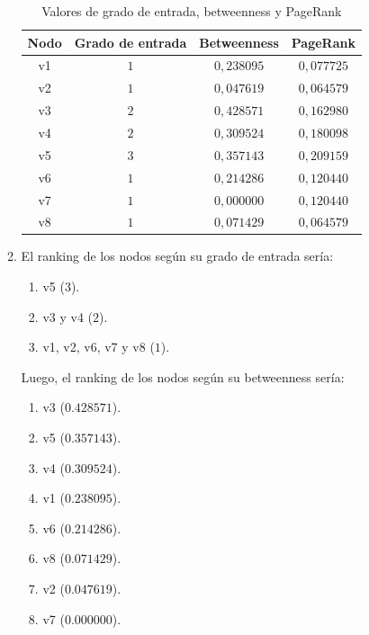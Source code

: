 \documentclass[12pt]{article}
\begin{document}
\begin{enumerate}
\begin{enumerate}
        \begin{table}[H]
            \centering
            \begin{tabular}{|c|c|c|c|}
            \hline
            \textbf{Nodo} & \textbf{Grado de entrada} & \textbf{Betweenness} & \textbf{PageRank} \\ \hline
            v1 & $1$ & $0,238095$ & $0,077725$ \\ \hline
            v2 & $1$ & $0,047619$ & $0,064579$ \\ \hline
            v3 & $2$ & $0,428571$ & $0,162980$ \\ \hline
            v4 & $2$ & $0,309524$ & $0,180098$ \\ \hline
            v5 & $3$ & $0,357143$ & $0,209159$ \\ \hline
            v6 & $1$ & $0,214286$ & $0,120440$ \\ \hline
            v7 & $1$ & $0,000000$ & $0,120440$ \\ \hline
            v8 & $1$ & $0,071429$ & $0,064579$ \\ \hline
            \end{tabular}
            \caption{Valores de grado de entrada, betweenness y PageRank}
            \label{tab:values_red_chica}
        \end{table}

        \item El ranking de los nodos según su grado de entrada sería:
        \begin{enumerate}
            \item v5 ($3$).
            \item v3 y v4 ($2$).
            \item v1, v2, v6, v7 y v8 ($1$).
        \end{enumerate}

        Luego, el ranking de los nodos según su betweenness sería:
        \begin{enumerate}
            \item v3 ($0.428571$).
            \item v5 ($0.357143$).
            \item v4 ($0.309524$).
            \item v1 ($0.238095$).
            \item v6 ($0.214286$).
            \item v8 ($0.071429$).
            \item v2 ($0.047619$).
            \item v7 ($0.000000$).
        \end{enumerate}


\end{enumerate}
\end{enumerate}
\end{document}
